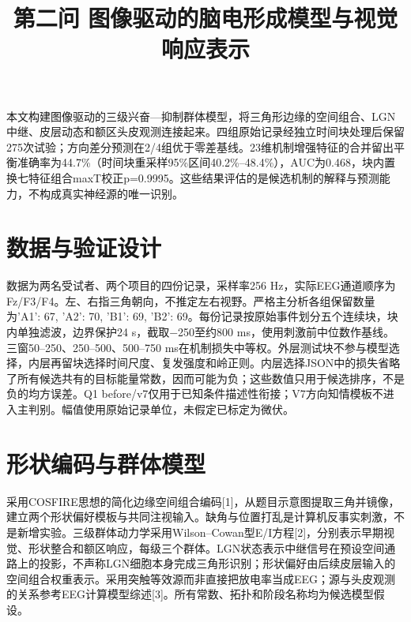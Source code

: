 \documentclass[UTF8,a4paper,11pt]{ctexart}
\begin{document}
\title{第二问 图像驱动的脑电形成模型与视觉响应表示}\author{}\date{}\maketitle

本文构建图像驱动的三级兴奋—抑制群体模型，将三角形边缘的空间组合、LGN中继、皮层动态和额区头皮观测连接起来。四组原始记录经独立时间块处理后保留275次试验；方向差分预测在2/4组优于零差基线。23维机制增强特征的合并留出平衡准确率为44.7\%（时间块重采样95\%区间40.2\%–48.4\%），AUC为0.468，块内置换七特征组合maxT校正p=0.9995。这些结果评估的是候选机制的解释与预测能力，不构成真实神经源的唯一识别。

\section{数据与验证设计}

数据为两名受试者、两个项目的四份记录，采样率256 Hz，实际EEG通道顺序为Fz/F3/F4。左、右指三角朝向，不推定左右视野。严格主分析各组保留数量为{'A1': 67, 'A2': 70, 'B1': 69, 'B2': 69}。每份记录按原始事件划分五个连续块，块内单独滤波，边界保护24 s，截取−250至约800 ms，使用刺激前中位数作基线。三窗50–250、250–500、500–750 ms在机制损失中等权。外层测试块不参与模型选择，内层再留块选择时间尺度、复发强度和岭正则。内层选择JSON中的损失省略了所有候选共有的目标能量常数，因而可能为负；这些数值只用于候选排序，不是负的均方误差。Q1 before/v7仅用于已知条件描述性衔接；V7方向知情模板不进入主判别。幅值使用原始记录单位，未假定已标定为微伏。

\section{形状编码与群体模型}

采用COSFIRE思想的简化边缘空间组合编码[1]，从题目示意图提取三角并镜像，建立两个形状偏好模板与共同注视输入。缺角与位置打乱是计算机反事实刺激，不是新增实验。三级群体动力学采用Wilson–Cowan型E/I方程[2]，分别表示早期视觉、形状整合和额区响应，每级三个群体。LGN状态表示中继信号在预设空间通路上的投影，不声称LGN细胞本身完成三角形识别；形状偏好由后续皮层输入的空间组合权重表示。采用突触等效源而非直接把放电率当成EEG；源与头皮观测的关系参考EEG计算模型综述[3]。所有常数、拓扑和阶段名称均为候选模型假设。
\end{document}
